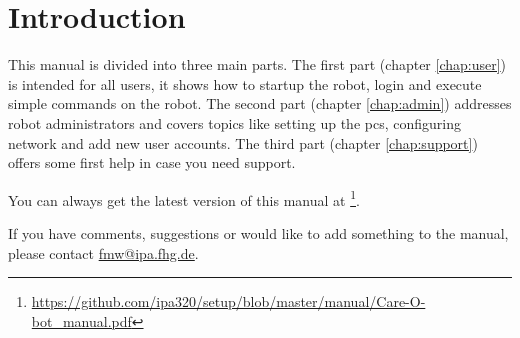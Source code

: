 \chapter{Introduction}
\label{chap:introduction} 

This manual is divided into three main parts. The first part (chapter \ref{chap:user}) is intended for all users, it shows how to startup the robot, login and execute simple commands on the robot. The second part (chapter \ref{chap:admin}) addresses robot administrators and covers topics like setting up the pcs, configuring network and add new user accounts. The third part (chapter \ref{chap:support}) offers some first help in case you need support.

You can always get the latest version of this manual at \footnote{\url{https://github.com/ipa320/setup/blob/master/manual/Care-O-bot_manual.pdf}}.

If you have comments, suggestions or would like to add something to the manual, please contact \href{mailto:fmw@ipa.fhg.de}{fmw@ipa.fhg.de}.